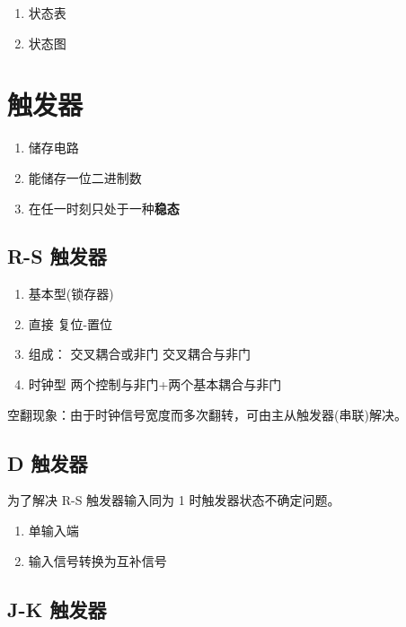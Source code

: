 \begin{enumerate}
    \item 状态表
    \item 状态图
\end{enumerate}

\newpage

\section{触发器}

\begin{enumerate}
    \item 储存电路
    \item 能储存一位二进制数
    \item 在任一时刻只处于一种\textbf{稳态}
\end{enumerate}

\subsection{R-S 触发器}

\begin{enumerate}
    \item 基本型(锁存器)
    \item 直接 复位-置位
    \item 组成：
          交叉耦合或非门
          交叉耦合与非门
    \item 时钟型
          两个控制与非门+两个基本耦合与非门
\end{enumerate}

空翻现象：由于时钟信号宽度而多次翻转，可由主从触发器(串联)解决。

\newpage

\subsection{D 触发器}

为了解决 R-S 触发器输入同为 1 时触发器状态不确定问题。

\begin{enumerate}
    \item 单输入端
    \item 输入信号转换为互补信号
\end{enumerate}

\subsection{J-K 触发器}

